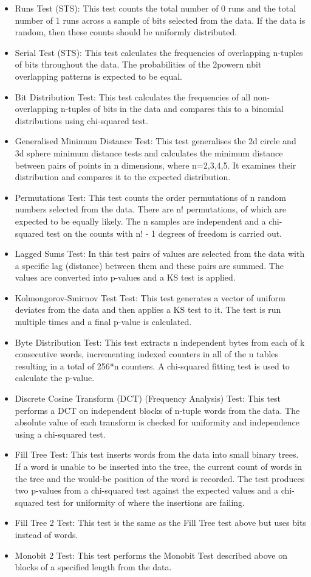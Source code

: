 \begin{itemize}
\item Runs Test (STS): This test counts the total number of 0 runs and the total number of 1 runs across a sample of bits selected from the data. If the data is random, then these counts should be uniformly distributed.
\item Serial Test (STS): This test calculates the frequencies of overlapping n-tuples of bits throughout the data. The probabilities of the 2powern nbit overlapping patterns is expected to be equal.
\item Bit Distribution Test: This test calculates the frequencies of all non-overlapping n-tuples of bits in the data and compares this to a binomial distributions using chi-squared test.
\item Generalised Minimum Distance Test: This test generalises the 2d circle and 3d sphere minimum distance tests and calculates the minimum distance between pairs of points in n dimensions, where n=2,3,4,5. It examines their distribution and compares it to the expected distribution.
\item Permutations Test: This test counts the order permutations of n random numbers selected from the data. There are n! permutations, of which are expected to be equally likely. The n samples are independent and a chi-squared test on the counts with n! - 1 degrees of freedom is carried out. 
\item Lagged Sums Test: In this test pairs of values are selected from the data with a specific lag (distance) between them and these pairs are summed. The values are converted into p-values and a KS test is applied.
\item Kolmongorov-Smirnov Test Test: This test generates a vector of uniform deviates from the data and then applies a KS test to it. The test is run multiple times and a final p-value is calculated.
\item Byte Distribution Test: This test extracts n independent bytes from each of k consecutive words, incrementing indexed counters in all of the n tables resulting in a total of 256*n counters. A chi-squared fitting test is used to calculate the p-value. 
\item Discrete Cosine Transform (DCT) (Frequency Analysis) Test: This test performs a DCT on independent blocks of n-tuple words from the data. The absolute value of each transform is checked for uniformity and independence using a chi-squared test.
\item Fill Tree Test: This test inserts words from the data into small binary trees. If a word is unable to be inserted into the tree, the current count of words in the tree and the would-be position of the word is recorded. The test produces two p-values from a chi-squared test against the expected values and a chi-squared test for uniformity of where the insertions are failing.  
\item Fill Tree 2 Test: This test is the same as the Fill Tree test above but uses bits instead of words. 
\item Monobit 2 Test: This test performs the Monobit Test described above on blocks of a specified length from the data. 
\end{itemize}

